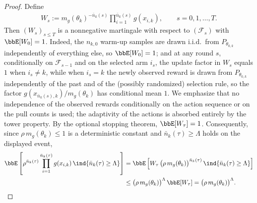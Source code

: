 \documentclass[11pt]{article}
\begin{document}
\begin{proof}
Define
\begin{align}
    W_s := m_g(\theta_k)^{-\bar n_k(s)} \prod_{i=1}^{\bar n_k(s)} g(x_{i,k}), \qquad s=0,1,\ldots,T.
    \label{eq:MGdef}
\end{align}
Then $(W_s)_{s \leq T}$ is a nonnegative martingale with respect to $(\mathcal{F}_s)$ with $\bbE[W_0]=1$. Indeed, the $n_{k,0}$ warm-up samples are drawn i.i.d.\ from $P_{\theta_{0,k}}$ independently of everything else, so $\bbE[W_0]=1$; and at any round $s$, conditionally on $\mathcal{F}_{s-1}$ and on the selected arm $i_s$, the update factor in $W_s$ equals $1$ when $i_s \neq k$, while when $i_s = k$ the newly observed reward is drawn from $P_{\theta_{0,k}}$ independently of the past and of the (possibly randomized) selection rule, so the factor $g(x_{\bar n_k(s),k})/m_g(\theta_k)$ has conditional mean $1$. We emphasize that no independence of the observed rewards conditionally on the action sequence or on the pull counts is used; the adaptivity of the actions is absorbed entirely by the tower property. By the optional stopping theorem, $\bbE[W_{\tau}]=1$. Consequently, since $\rho\, m_g(\theta_k) \leq 1$ is a deterministic constant and $\bar n_k(\tau) \geq \Lambda$ holds on the displayed event,
\begin{align*}
    \bbE\left[ \rho^{\bar n_k(\tau)} \prod_{i=1}^{\bar n_k(\tau)} g(x_{i,k})\, \ind\{\bar n_k(\tau) \geq \Lambda\} \right]
    &= \bbE\left[ W_{\tau}\, \big(\rho\, m_g(\theta_k)\big)^{\bar n_k(\tau)}\, \ind\{\bar n_k(\tau) \geq \Lambda\} \right]
    \\
    &\leq \big(\rho\, m_g(\theta_k)\big)^{\Lambda}\, \bbE[W_{\tau}] = \big(\rho\, m_g(\theta_k)\big)^{\Lambda}.
\end{align*}
\end{proof}
\end{document}

